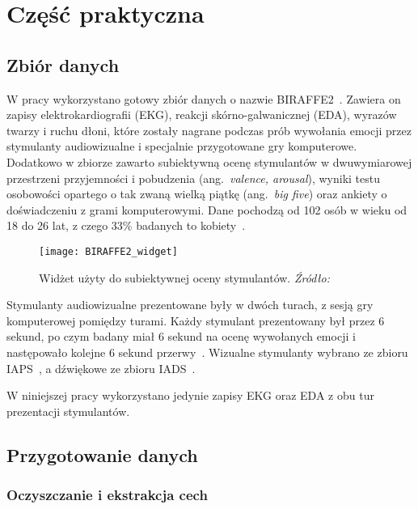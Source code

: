 \chapter{Część praktyczna}\label{ch:czesc-praktyczna}

\section{Zbiór danych}\label{sec:zbior-danych}

W pracy wykorzystano gotowy zbiór danych o nazwie BIRAFFE2~\cite{Kutt2022}.
Zawiera on zapisy elektrokardiografii (EKG), reakcji skórno-galwanicznej (EDA), wyrazów twarzy i ruchu dłoni, które zostały nagrane podczas prób wywołania emocji przez stymulanty audiowizualne i specjalnie przygotowane gry komputerowe.
Dodatkowo w zbiorze zawarto subiektywną ocenę stymulantów w dwuwymiarowej przestrzeni przyjemności i pobudzenia (ang.~\textit{valence, arousal}), wyniki testu osobowości opartego o tak zwaną wielką piątkę (ang.~\textit{big five}) oraz ankiety o doświadczeniu z grami komputerowymi.
Dane pochodzą od 102 osób w wieku od 18 do 26 lat, z czego 33\% badanych to kobiety~\cite{Kutt2022}.

\begin{figure}[h]
    \centering
    \texttt{[image: BIRAFFE2\_widget]}
    \caption{Widżet użyty do subiektywnej oceny stymulantów. \textit{Źródło:~\cite{Kutt2022}}}
    \label{fig:BIRAFFE2-widget}
\end{figure}

Stymulanty audiowizualne prezentowane były w dwóch turach, z sesją gry komputerowej pomiędzy turami.
Każdy stymulant prezentowany był przez 6 sekund, po czym badany miał 6 sekund na ocenę wywołanych emocji i następowało kolejne 6 sekund przerwy~\cite{Kutt2022}.
Wizualne stymulanty wybrano ze zbioru IAPS~\cite{IAPS}, a dźwiękowe ze zbioru IADS~\cite{IADS}.

W niniejszej pracy wykorzystano jedynie zapisy EKG oraz EDA z obu tur prezentacji stymulantów.

\section{Przygotowanie danych}\label{sec:przygotowanie-danych}

\subsection{Oczyszczanie i ekstrakcja cech}\label{subsec:oczyszczanie-i-ekstrakcja-cech}

